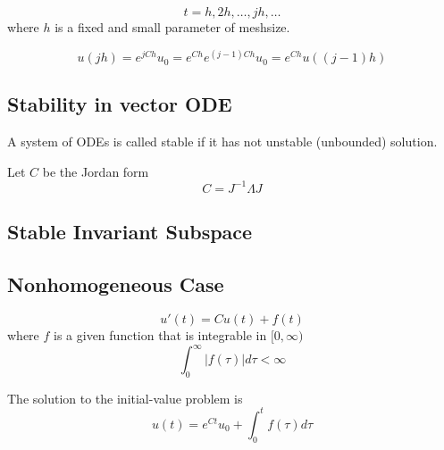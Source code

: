 \documentclass{blog}
\begin{document}
\begin{definition}
    \begin{equation}
        t = h, 2h, \dots, jh, \dots
    \end{equation}
    where $h$ is a fixed and small parameter of meshsize.

    \begin{equation}
        u(jh) = e^{jCh} u_{0} = e^{Ch} e^{(j-1)Ch} u_{0} = e^{Ch} u((j-1)h)
    \end{equation}
\end{definition}

\subsection{Stability in vector ODE}
\begin{definition}
    A system of ODEs is called stable if it has not unstable (unbounded) solution.

    Let $C$ be the Jordan form
    \begin{equation}
        C = J^{-1} \Lambda J
    \end{equation}
\end{definition}

\subsection{Stable Invariant Subspace}
\begin{definition}
\end{definition}

\subsection{Nonhomogeneous Case}
\begin{definition}
    \begin{equation}
        u'(t) = Cu(t) + f(t)
    \end{equation}
    where $f$ is a given function that is integrable in $[0, \infty)$
    \begin{equation}
        \int_{0}^{\infty} |f(\tau)| d\tau < \infty
    \end{equation}
\end{definition}

The solution to the initial-value problem is
\cite[Chapter 4]{CHICONE_2024_ORDINARY_DIFFERENTIAL_EQUATIONS_WITH_APPLICATIONS}
\begin{equation}
    u(t) = e^{Ct} u_{0} + \int_{0}^{t} f(\tau) d\tau
\end{equation}
\end{document}

